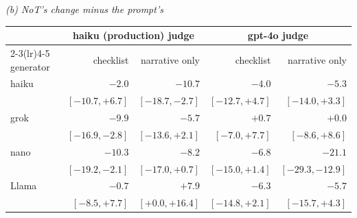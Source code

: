 {\medskip
\textit{(b) NoT's change minus the prompt's}\\[2pt]
\begin{tabular}{@{}lrrrr@{}}
\toprule
 & \multicolumn{2}{c}{haiku (production) judge} & \multicolumn{2}{c}{gpt-4o judge} \\
\cmidrule(lr){2-3}\cmidrule(lr){4-5}
generator & checklist & narrative only & checklist & narrative only \\
\midrule
haiku & $-2.0$ & $-10.7$ & $-4.0$ & $-5.3$ \\
 & $[-10.7, +6.7]$ & $[-18.7, -2.7]$ & $[-12.7, +4.7]$ & $[-14.0, +3.3]$ \\[1pt]
grok & $-9.9$ & $-5.7$ & $+0.7$ & $+0.0$ \\
 & $[-16.9, -2.8]$ & $[-13.6, +2.1]$ & $[-7.0, +7.7]$ & $[-8.6, +8.6]$ \\[1pt]
nano & $-10.3$ & $-8.2$ & $-6.8$ & $-21.1$ \\
 & $[-19.2, -2.1]$ & $[-17.0, +0.7]$ & $[-15.0, +1.4]$ & $[-29.3, -12.9]$ \\[1pt]
Llama & $-0.7$ & $+7.9$ & $-6.3$ & $-5.7$ \\
 & $[-8.5, +7.7]$ & $[+0.0, +16.4]$ & $[-14.8, +2.1]$ & $[-15.7, +4.3]$ \\[1pt]
\bottomrule
\end{tabular}
}
